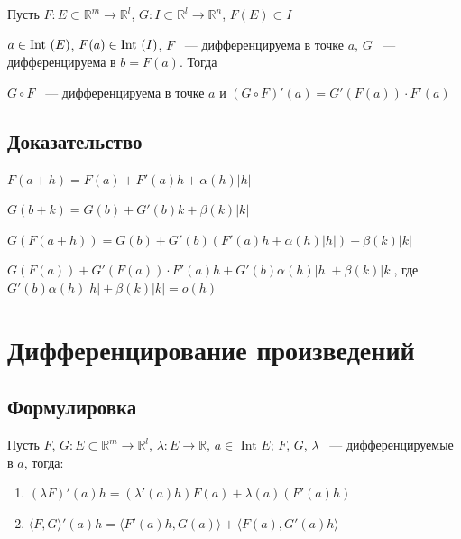 \documentclass{article}
\begin{document}
            Пусть $F : E \subset \mathbb{R}^m \rightarrow \mathbb{R}^l$, $G : I \subset \mathbb{R}^l \rightarrow \mathbb{R}^n$, $F(E) \subset I$
            
            $a \in \Int (E)$, $F(a) \in \Int (I)$, $F$ ~--- дифференцируема в точке $a$, $G$ ~--- дифференцируема в $b = F(a)$. Тогда
            
            $G \circ F$ ~--- дифференцируема в точке $a$ и $\left( G \circ F \right)'(a) = G'\left( F(a) \right) \cdot F'(a)$
            
        \subsection{Доказательство}
        
            $F(a + h) = F(a) + F'(a)h + \alpha(h) |h|$
            
            $G(b + k) = G(b) + G'(b)k + \beta(k) |k|$
            
            $G(F(a + h)) = G(b) + G'(b) (F'(a)h + \alpha(h)|h|) + \beta(k) |k|$
            
            $G(F(a)) + G'(F(a)) \cdot F'(a)h + G'(b)\alpha(h)|h| + \beta(k) |k|$, где $G'(b)\alpha(h)|h| + \beta(k)|k| = o(h)$
            
    \newpage
    
    \section{Дифференцирование произведений}
    
        \subsection{Формулировка}
        
            Пусть $F$, $G : E \subset \mathbb{R}^m \rightarrow \mathbb{R}^l$, $\lambda : E \rightarrow \mathbb{R}$, $a \in$ Int $E$; $F$, $G$, $\lambda$ ~--- дифференцируемые в $a$, тогда:
            
            \begin{enumerate}
            
                \item $\left( \lambda F \right)'(a)h = (\lambda'(a)h)F(a) + \lambda(a)\left(F'(a)h\right)$
                
                \item $\langle F, G \rangle'(a)h = \langle F'(a)h, G(a)\rangle + \langle F(a), G'(a)h \rangle$
                
            \end{enumerate}
            
\end{document}
